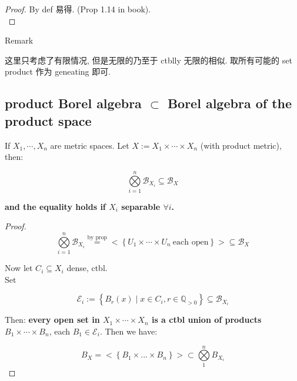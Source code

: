 \begin{proof}

By def 易得. (Prop 1.14 in book).\\

\end{proof}

\begin{qlremark}{Remark}

这里只考虑了有限情况, 但是无限的乃至于 ctblly 无限的相似. 取所有可能的 set product 作为 geneating 即可.

\end{qlremark}

\subsection{\texorpdfstring{product Borel algebra \(\subset\) Borel algebra of the product space}{product Borel algebra \textbackslash subset Borel algebra of the product space}}\label{product-borel-algebra-subset-borel-algebra-of-the-product-space}

\begin{proposition}

If \(X_{1},\cdots,X_{n}\) are metric spaces. Let \(X := X_{1} \times \cdots \times X_{n}\) (with product metric), then:

\[\bigotimes\limits_{i = 1}^{n}\mathcal{B}_{X_{i}} \subseteq \mathcal{B}_{X}\]

\textbf{and the equality holds if \(X_{i}\) separable \(\forall i\).}

\end{proposition}

\begin{proof}

\[\bigotimes\limits_{i = 1}^{n}\mathcal{B}_{X_{i}}\overset{\text{by prop}}{=} < \left\{ {U_{1} \times \cdots \times U_{n}\ \text{each open}} \right\} > \subseteq \mathcal{B}_{X}\]

Now let \(C_{i} \subseteq X_{i}\) dense, ctbl.\\
Set

\[\mathcal{E}_{i} := \left\{ {B_{r}(x) \mid x \in C_{i}, r \in \mathbb{Q}_{> 0}} \right\} \subseteq \mathcal{B}_{X_{i}}\]

Then: \textbf{every open set in \(X_{1} \times \cdots \times X_{n}\) is a ctbl union of products \(B_{1} \times \cdots \times B_{n}\)}, each \(B_{1} \in \mathcal{E}_{i}\). Then we have:

\[B_{X} = < \left\{ {B_{1} \times ... \times B_{n}} \right\} > \subset \bigotimes\limits_{1}^{n}B_{X_{i}}\]

\end{proof}


